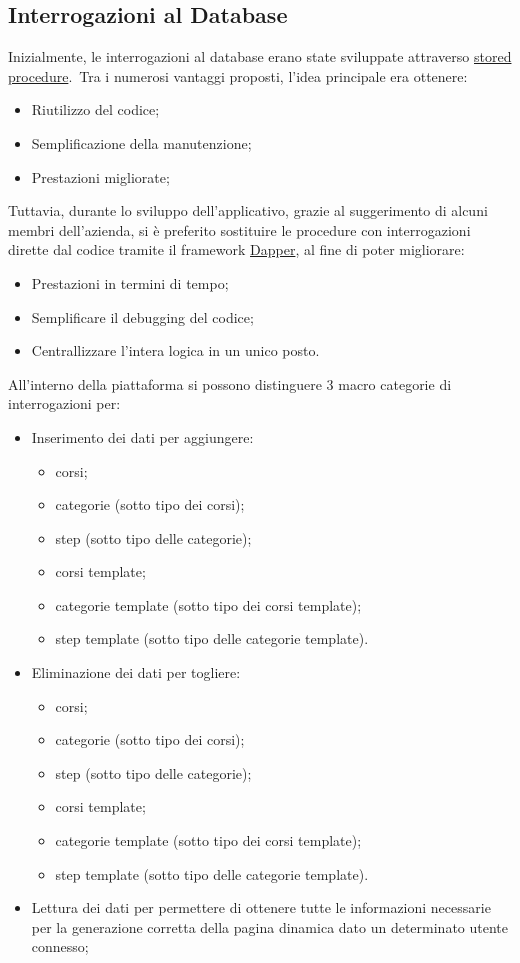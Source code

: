 \subsection{Interrogazioni al Database}
Inizialmente, le interrogazioni al database erano state sviluppate attraverso \href{https://learn.microsoft.com/it-it/sql/relational-databases/stored-procedures/stored-procedures-database-engine?view=sql-server-ver16}{stored 
procedure}.\ Tra i numerosi vantaggi proposti, l'idea principale era ottenere:
\begin{itemize}
	\item Riutilizzo del codice;
	\item Semplificazione della manutenzione;
	\item Prestazioni migliorate;
\end{itemize}
Tuttavia, durante lo sviluppo dell'applicativo, grazie al suggerimento di alcuni membri
dell'azienda, si è preferito sostituire le procedure con interrogazioni dirette dal codice
tramite il framework \href{https://learn.microsoft.com/it-it/azure/azure-sql/database/elastic-scale-working-with-dapper?view=azuresql}{Dapper}, al fine di poter migliorare:
\begin{itemize}
	\item Prestazioni in termini di tempo;
	\item Semplificare il debugging del codice;
	\item Centrallizzare l'intera logica in un unico posto.
\end{itemize}
All'interno della piattaforma si possono distinguere 3 macro categorie di interrogazioni per:
\begin{itemize}
	\item Inserimento dei dati per aggiungere:
	\begin{itemize}
		\item corsi;
		\item categorie (sotto tipo dei corsi);
		\item step (sotto tipo delle categorie);
		\item corsi template;
		\item categorie template (sotto tipo dei corsi template);
		\item step template (sotto tipo delle categorie template).
	\end{itemize}
	\item Eliminazione dei dati per togliere:
	\begin{itemize}
		\item corsi;
		\item categorie (sotto tipo dei corsi);
		\item step (sotto tipo delle categorie);
		\item corsi template;
		\item categorie template (sotto tipo dei corsi template);
		\item step template (sotto tipo delle categorie template).
	\end{itemize}
	\item Lettura dei dati per permettere di ottenere tutte le informazioni necessarie per la generazione
	corretta della pagina dinamica dato un determinato utente connesso;
\end{itemize}


